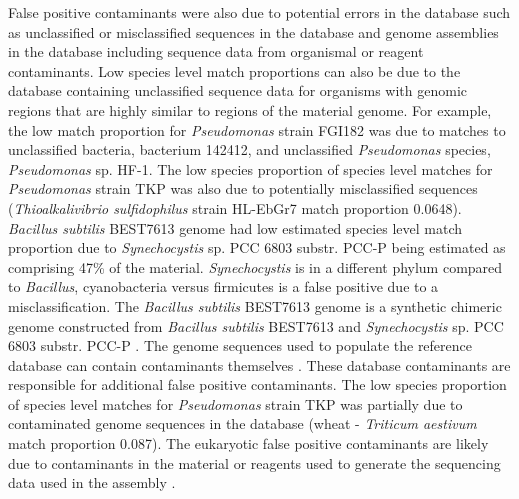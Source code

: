 \documentclass[fleqn,10pt,lineno]{wlpeerj}\usepackage[]{graphicx}\usepackage[]{color}
\begin{document}
False positive contaminants were also due to potential errors in the database such as unclassified or misclassified sequences in the database and genome assemblies in the database including sequence data from organismal or reagent contaminants. 
Low species level match proportions can also be due to the database containing unclassified sequence data for organisms with genomic regions that are highly similar to regions of the material genome. 
For example, the low match proportion for \textit{Pseudomonas} strain FGI182 was due to matches to unclassified bacteria, bacterium 142412, and unclassified \textit{Pseudomonas} species, \textit{Pseudomonas} sp. HF-1. 
The low species proportion of species level matches for \textit{Pseudomonas} strain TKP was also due to potentially misclassified sequences (\textit{Thioalkalivibrio sulfidophilus} strain HL-EbGr7 match proportion 0.0648).
\textit{Bacillus subtilis} BEST7613 genome had low estimated species level match proportion due to \textit{Synechocystis} sp. PCC 6803 substr. PCC-P being estimated as comprising 47\% of the material. 
\textit{Synechocystis} is in a different phylum compared to \textit{Bacillus}, cyanobacteria versus firmicutes is a false positive due to a misclassification. 
The \textit{Bacillus subtilis} BEST7613 genome is a synthetic chimeric genome constructed from \textit{Bacillus subtilis} BEST7613 and \textit{Synechocystis} sp. PCC 6803 substr. PCC-P \citep{watanabe2012complete}. 
The genome sequences used to populate the reference database can contain contaminants themselves \citep{parks2015checkm}. 
These database contaminants are responsible for additional false positive contaminants.
The low species proportion of species level matches for \textit{Pseudomonas} strain TKP was partially due to contaminated genome sequences in the database (wheat - \textit{Triticum aestivum} match proportion 0.087). 
The eukaryotic false positive contaminants are likely due to contaminants in the material or reagents used to generate the sequencing data used in the assembly \citep{parks2015checkm}. 
\end{document}
